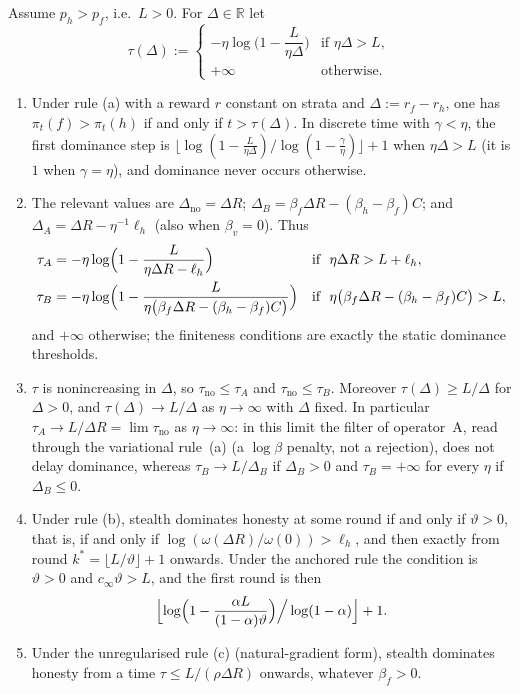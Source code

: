 \begin{corollary}\label{cor:hitting-times}
Assume $p_h>p_f$, i.e.\ $L>0$. For $\Delta\in\mathbb R$ let
\[
\tau(\Delta):=\begin{cases}
-\eta\log\bigl(1-\dfrac{L}{\eta\Delta}\bigr) & \text{if }\eta\Delta>L,\\[1.5ex]
+\infty & \text{otherwise.}
\end{cases}
\]
\begin{enumerate}
\item[\textup{(i)}] Under rule \textup{(a)} with a reward $r$ constant on
strata and $\Delta:=r_f-r_h$, one has $\pi_t(f)>\pi_t(h)$ if and only if
$t>\tau(\Delta)$. In discrete time with $\gamma<\eta$, the first dominance
step is
$\bigl\lfloor\log(1-\tfrac{L}{\eta\Delta})/\log(1-\tfrac{\gamma}{\eta})\bigr\rfloor+1$
when $\eta\Delta>L$ (it is $1$ when $\gamma=\eta$), and dominance never
occurs otherwise.
\item[\textup{(ii)}] The relevant values are
$\Delta_{\mathrm{no}}=\Delta R$;
$\Delta_B=\beta_f\Delta R-(\beta_h-\beta_f)C$; and
$\Delta_A=\Delta R-\eta^{-1}\ell_h$ (also when $\beta_v=0$). Thus
\begin{align*}
\tau_A&=-\eta\log\Bigl(1-\frac{L}{\eta\Delta R-\ell_h}\Bigr)
&&\text{if }\ \eta\Delta R>L+\ell_h,\\
\tau_B&=-\eta\log\Bigl(1-\frac{L}{\eta\bigl(\beta_f\Delta R-(\beta_h-\beta_f)C\bigr)}\Bigr)
&&\text{if }\ \eta\bigl(\beta_f\Delta R-(\beta_h-\beta_f)C\bigr)>L,
\end{align*}
and $+\infty$ otherwise; the finiteness conditions are exactly the static
dominance thresholds.
\item[\textup{(iii)}] $\tau$ is nonincreasing in $\Delta$, so
$\tau_{\mathrm{no}}\le\tau_A$ and $\tau_{\mathrm{no}}\le\tau_B$. Moreover
$\tau(\Delta)\ge L/\Delta$ for $\Delta>0$, and
$\tau(\Delta)\to L/\Delta$ as $\eta\to\infty$ with $\Delta$ fixed. In
particular $\tau_A\to L/\Delta R=\lim\tau_{\mathrm{no}}$ as
$\eta\to\infty$: in this limit the filter of operator~A, read through the variational rule~(a) (a $\log\beta$ penalty, not a rejection), does not delay
dominance, whereas $\tau_B\to L/\Delta_B$ if $\Delta_B>0$ and
$\tau_B=+\infty$ for every $\eta$ if $\Delta_B\le0$.
\item[\textup{(iv)}] Under rule \textup{(b)}, stealth dominates honesty at
some round if and only if $\vartheta>0$, that is, if and only if
$\log(\omega(\Delta R)/\omega(0))>\ell_h$, and then exactly from
round $k^\ast=\lfloor L/\vartheta\rfloor+1$ onwards. Under the anchored rule
the condition is $\vartheta>0$ and $c_\infty\vartheta>L$, and the first
round is then
\[
\Bigl\lfloor\log\Bigl(1-\frac{\alpha L}{(1-\alpha)\vartheta}\Bigr)\Big/\log(1-\alpha)\Bigr\rfloor+1 .
\]
\item[\textup{(v)}] Under the unregularised rule \textup{(c)} (natural-gradient form), stealth
dominates honesty from a time $\tau\le L/(\rho\Delta R)$ onwards, whatever
$\beta_f>0$.
\end{enumerate}
\end{corollary}

